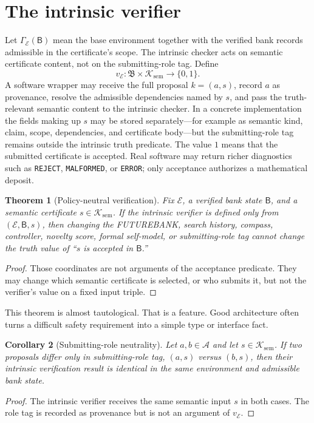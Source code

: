 \documentclass[11pt,openany]{book}
\newtheorem{theorem}{Theorem}[chapter]
\newtheorem{corollary}[theorem]{Corollary}
\theoremstyle{definition}
\theoremstyle{remark}
\newcommand{\Bank}{\mathsf{B}}
\newcommand{\BankSpace}{\mathfrak{B}}
\newcommand{\Cert}{\mathcal{K}}
\newcommand{\Env}{\mathcal{E}}
\newcommand{\Agents}{\mathcal{A}}
\begin{document}
\section{The intrinsic verifier}
Let $\Gamma_{\Env}(\Bank)$ mean the base environment together with the verified bank records admissible in the certificate's scope. The intrinsic checker acts on semantic certificate content, not on the submitting-role tag. Define
\[
v_{\Env}:\BankSpace\times\Cert_{\mathrm{sem}}\longrightarrow\{0,1\}.
\]
A software wrapper may receive the full proposal $k=(a,s)$, record $a$ as provenance, resolve the admissible dependencies named by $s$, and pass the truth-relevant semantic content to the intrinsic checker. In a concrete implementation the fields making up $s$ may be stored separately---for example as semantic kind, claim, scope, dependencies, and certificate body---but the submitting-role tag remains outside the intrinsic truth predicate.
The value $1$ means that the submitted certificate is accepted. Real software may return richer diagnostics such as \texttt{REJECT}, \texttt{MALFORMED}, or \texttt{ERROR}; only acceptance authorizes a mathematical deposit.

\begin{theorem}[Policy-neutral verification]\label{thm:neutral}
Fix $\Env$, a verified bank state $\Bank$, and a semantic certificate $s\in\Cert_{\mathrm{sem}}$. If the intrinsic verifier is defined only from $(\Env,\Bank,s)$, then changing the FUTUREBANK, search history, compass, controller, novelty score, formal self-model, or submitting-role tag cannot change the truth value of ``$s$ is accepted in $\Bank$.''
\end{theorem}
\begin{proof}
Those coordinates are not arguments of the acceptance predicate. They may change which semantic certificate is selected, or who submits it, but not the verifier's value on a fixed input triple.
\end{proof}

This theorem is almost tautological. That is a feature. Good architecture often turns a difficult safety requirement into a simple type or interface fact.

\begin{corollary}[Submitting-role neutrality]\label{cor:roleneutral}
Let $a,b\in\Agents$ and let $s\in\Cert_{\mathrm{sem}}$. If two proposals differ only in submitting-role tag, $(a,s)$ versus $(b,s)$, then their intrinsic verification result is identical in the same environment and admissible bank state.
\end{corollary}
\begin{proof}
The intrinsic verifier receives the same semantic input $s$ in both cases. The role tag is recorded as provenance but is not an argument of $v_{\Env}$.
\end{proof}
\end{document}
